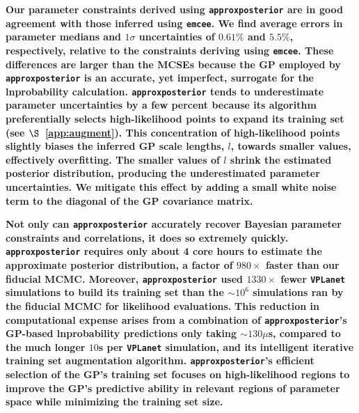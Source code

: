 \documentclass[twocolumn]{aastex62}
\newcommand{\xxx}[1]{{\textbf{#1}}}
\newcommand{\vplanet}[0]{\texttt{VPLanet}\xspace}
\newcommand{\emcee}[0]{\texttt{emcee}\xspace}
\newcommand{\approxposterior}[0]{\texttt{approxposterior}\xspace}
\begin{document}
\xxx{Our parameter constraints derived using \approxposterior are in good agreement with those inferred using \emcee. We find average errors in parameter medians and $1\sigma$ uncertainties of $0.61\%$ and $5.5\%$, respectively, relative to the constraints deriving using \emcee. These differences are larger than the MCSEs because the GP employed by \approxposterior is an accurate, yet imperfect, surrogate for the lnprobability calculation. \approxposterior tends to underestimate parameter uncertainties by a few percent because its algorithm preferentially selects high-likelihood points to expand its training set (see $\S$~\ref{app:augment}). This concentration of high-likelihood points slightly biases the inferred GP scale lengths, $l$, towards smaller values, effectively overfitting. The smaller values of $l$ shrink the estimated posterior distribution, producing the underestimated parameter uncertainties. We mitigate this effect by adding a small white noise term to the diagonal of the GP covariance matrix.}

\xxx{Not only can \approxposterior accurately recover Bayesian parameter constraints and correlations, it does so extremely quickly. \approxposterior requires only about 4 core hours to estimate the approximate posterior distribution, a factor of $980\times$ faster than our fiducial MCMC. Moreover, \approxposterior used $1330\times$ fewer \vplanet simulations to build its training set than the ${\sim}10^6$ simulations ran by the fiducial MCMC for likelihood evaluations.} \xxx{This reduction in computational expense arises from a combination of \approxposterior's GP-based lnprobability predictions only taking ${\sim}130\mu$s, compared to the much longer $10$s per \vplanet simulation, and its intelligent iterative training set augmentation algorithm. \approxposterior's efficient selection of the GP's training set focuses on high-likelihood regions to improve the GP's predictive ability in relevant regions of parameter space while minimizing the training set size.}
\end{document}
